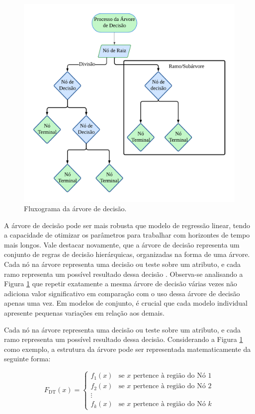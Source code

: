  \begin{figure}[H]
 	\centering
 	\caption{Fluxograma da árvore de decisão.}
 	\label{fig:decison}
 	\includegraphics[width=0.7\linewidth]{Modelos/Figuras/decison.pdf}
 	
 \end{figure}
  
 A árvore de decisão pode ser mais robusta que modelo de regressão linear, tendo a capacidade de otimizar os parâmetros para trabalhar com horizontes de tempo mais longos. Vale destacar novamente, que a árvore de decisão representa um conjunto de regras de decisão hierárquicas, organizadas na forma de uma árvore. Cada nó na árvore representa uma decisão ou teste sobre um atributo, e cada ramo representa um possível resultado dessa decisão \cite{GIFFORD2023100296}. Observa-se analisando a Figura \ref{fig:decison} que repetir exatamente a mesma árvore de decisão várias vezes não adiciona valor significativo em comparação com o uso dessa árvore de decisão apenas uma vez. Em modelos de conjunto, é crucial que cada modelo individual apresente pequenas variações em relação aos demais.
 

Cada nó na árvore representa uma decisão ou teste sobre um atributo, e cada ramo representa um possível resultado dessa decisão. Considerando a Figura \ref{fig:decison} como exemplo, a estrutura da árvore pode ser representada matematicamente da seguinte forma:
 
 $$ F_{\text{DT}}(x) = \begin{cases} 
 	f_1(x) & \text{se } x \text{ pertence à região do Nó 1} \\
 	f_2(x) & \text{se } x \text{ pertence à região do Nó 2} \\
 	\vdots \\
 	f_k(x) & \text{se } x \text{ pertence à região do Nó } k 
 \end{cases} $$
 
